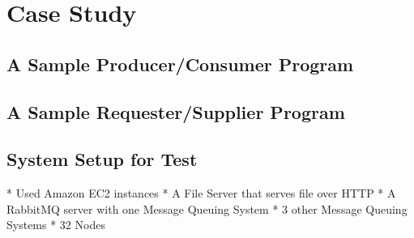 \chapter{Case Study}\label{chapter:case_study}

\section{A Sample Producer/Consumer Program}

\section{A Sample Requester/Supplier Program}

\section{System Setup for Test}
* Used Amazon EC2 instances
* A File Server that serves file over HTTP
* A RabbitMQ server with one Message Queuing System
* 3 other Message Queuing Systems
* 32 Nodes
